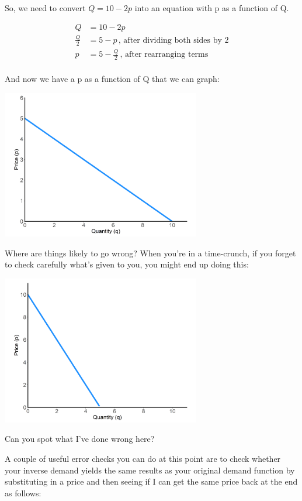 \documentclass[11pt,]{article}
\begin{document}
So, we need to convert \(Q=10-2p\) into an equation with p as a function
of Q.

\begin{align*}
  Q&=10-2p\\
  \frac{Q}{2}&=5-p\,\text{, after dividing both sides by 2}\\
  p&=5-\frac{Q}{2}\,\text{, after rearranging terms}\\
\end{align*}

And now we have a p as a function of Q that we can graph:

\begin{center}
\includegraphics[width=0.65\textwidth]{../images/eq_1.png}
\end{center}

Where are things likely to go wrong? When you're in a time-crunch, if
you forget to check carefully what's given to you, you might end up
doing this:

\begin{center}
\includegraphics[width=0.65\textwidth]{../images/eq_wrong.png}
\end{center}

Can you spot what I've done wrong here?

A couple of useful error checks you can do at this point are to check
whether your inverse demand yields the same results as your original
demand function by substituting in a price and then seeing if I can get
the same price back at the end as follows:
\end{document}
